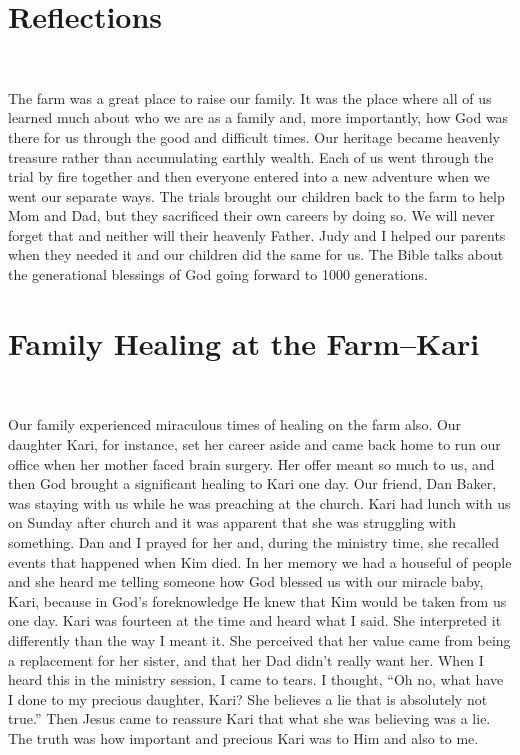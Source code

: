\documentclass[oneside]{book}
\begin{document}
\section{Reflections}
\

The farm was a great place to raise our family. It was the place where all of us learned much about who we are as a family and, more importantly, how God was there for us through the good and difficult times. Our heritage became heavenly treasure rather than accumulating earthly wealth. Each of us went through the trial by fire together and then everyone entered into a new adventure when we went our separate ways. The trials brought our children back to the farm to help Mom and Dad, but they sacrificed their own careers by doing so. We will never forget that and neither will their heavenly Father. Judy and I helped our parents when they needed it and our children did the same for us. The Bible talks about the generational blessings of God going forward to 1000 generations.


\section{Family Healing at the Farm--Kari}
\

Our family experienced miraculous times of healing on the farm also. Our daughter Kari, for instance, set her career aside and came back home to run our office when her mother faced brain surgery. Her offer meant so much to us, and then God brought a significant healing to Kari one day. Our friend, Dan Baker, was staying with us while he was preaching at the church. Kari had lunch with us on Sunday after church and it was apparent that she was struggling with something. Dan and I prayed for her and, during the ministry time, she recalled events that happened when Kim died. In her memory we had a houseful of people and she heard me telling someone how God blessed us with our miracle baby, Kari, because in God’s foreknowledge He knew that Kim would be taken from us one day. Kari was fourteen at the time and heard what I said. She interpreted it differently than the way I meant it. She perceived that her value came from being a replacement for her sister, and that her Dad didn’t really want her. When I heard this in the ministry session, I came to tears. I thought, “Oh no, what have I done to my precious daughter, Kari? She believes a lie that is absolutely not true.” Then Jesus came to reassure Kari that what she was believing was a lie. The truth was how important and precious Kari was to Him and also to me. 
\end{document}
